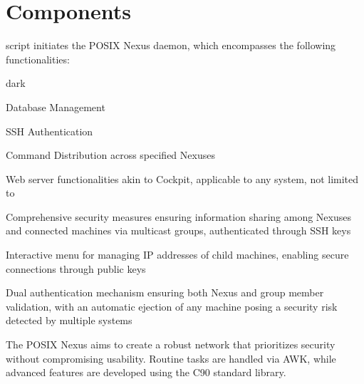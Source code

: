 \section{Components}
\label{sec:component}
 script initiates the POSIX Nexus daemon, which encompasses the following functionalities:
\bigskip
\begin{baseBoxOne}{}{dark}
    \begin{posnexItemize}
        \item[\sA] Database Management
        \item[\sA] SSH Authentication
        \item[\sA] Command Distribution across specified Nexuses
        \item[\sA] Web server functionalities akin to Cockpit, applicable to any system, not limited to 
        \item[\sA] Comprehensive security measures ensuring information sharing among Nexuses and connected machines via multicast groups, authenticated through SSH keys
        \item[\sA] Interactive menu for managing IP addresses of child machines, enabling secure connections through public keys
        \item[\sA] Dual authentication mechanism ensuring both Nexus and group member validation, with an automatic ejection of any machine posing a security risk detected by multiple systems
    \end{posnexItemize}
\end{baseBoxOne}
\bigskip
The POSIX Nexus aims to create a robust network that prioritizes security without compromising usability. Routine tasks are handled via AWK, while advanced features are developed using the C90 standard library.


